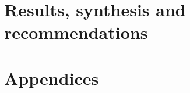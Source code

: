 \documentclass[11pt,a4paper,twoside,openany]{book}
\begin{document}
\part{Results, synthesis and recommendations}









\appendix
\part{Appendices}




\backmatter


\end{document}
